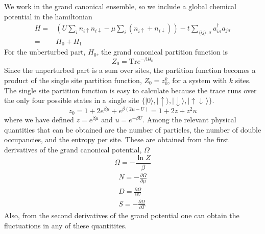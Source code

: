\documentclass[11pt,letter]{article}
\newcommand{\dbl}{\ensuremath{ \uparrow\! \downarrow \, }}
\newcommand{\spup}{\ensuremath{ \uparrow }}
\newcommand{\spdn}{\ensuremath{ \downarrow}}
\begin{document}
We work in the grand canonical ensemble, so we include a global chemical potential
in the hamiltonian
\begin{equation}
\begin{split}
  H = &  
         \left( U\sum_{i} n_{i\spup} n_{i\spdn}  
         - \mu\sum_{i}( n_{i\spup} + n_{i\spdn} ) \right)
-t \sum_{ \langle ij \rangle, \sigma   } 
          a_{i\sigma}^{\dagger}a_{j\sigma} \\
   = &  H_{0} + H_{1} 
\end{split}
\end{equation}
For the unberturbed part, $H_{0}$, the grand canonical partition function is 
\begin{equation}
 Z_{0} = \text{Tr} e^{-\beta H_{0}} 
\end{equation}
Since the unperturbed part is a sum over sites, the partition function becomes
a product of the single site partition function, $Z_{0} = z_{0}^{k}$, for a
system with $k$ sites.  The single site partition function  is easy to
calculate because the trace runs over the only four possible states in a single
site $\lbrace |0\rangle, |\spup\rangle, |\spdn\rangle, |\dbl\rangle\rbrace$.
\begin{equation}
 z_{0} = 1 + 2 e^{\beta\mu} + e^{\beta (2\mu-U)} = 1 + 2z + z^{2}u 
\end{equation}
where we have defined $z=e^{\beta\mu}$ and $u=e^{-\beta U }$.  Among the
relevant physical quantities that can be obtained are the number of particles,
the number of double occupancies, and the entropy per site.  These are obtained
from the first derivatives of the grand canonical potential, $\Omega$
\begin{equation}
  \Omega = - \frac{\ln Z}{\beta}
\end{equation}
\begin{gather}
  N = -\frac{\partial \Omega}{ \partial \mu }\\
  D = \frac{\partial \Omega}{ \partial U }  \\
  S = -\frac{\partial \Omega}{ \partial T} 
\end{gather}
Also, from the second derivatives of the grand potential one can obtain the
fluctuations in any of these quantitites. 
\end{document}
